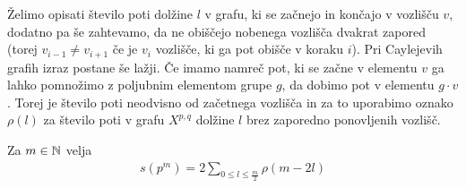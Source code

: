 Želimo opisati število poti dolžine \(l\) v grafu, ki se začnejo in končajo v vozlišču \(v\), dodatno pa še zahtevamo, da ne obiščejo nobenega vozlišča dvakrat zapored (torej \(v_{i-1}\neq v_{i+1}\) če je \(v_i\) vozlišče, ki ga pot obišče v koraku \(i\)). Pri Caylejevih grafih izraz postane še lažji. Če imamo namreč pot, ki se začne v elementu \(v\) ga lahko pomnožimo z poljubnim elementom grupe \(g\), da dobimo pot v elementu \(g\cdot v\). Torej je število poti neodvisno od začetnega vozlišča in za to uporabimo oznako \(\rho(l)\) za število poti v grafu \(X^{p,q}\) dolžine \(l\) brez zaporedno ponovljenih vozlišč.

\begin{izrek}
    Za \(m\in \mathbb N\) velja
    \begin{align*}
        s(p^m) = 2\sum_{0\leq l\leq \frac{m}{2}}\rho(m-2l)
    \end{align*}
\end{izrek}

